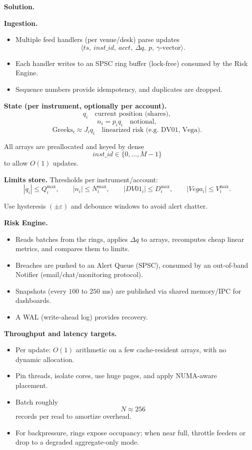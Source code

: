 \documentclass[11pt,letterpaper,openany]{book}
\begin{document}
\textbf{Solution.}


\textbf{Ingestion.}
\begin{itemize}
\item Multiple feed handlers (per venue/desk) parse updates
\[
\langle ts,\ inst\_id,\ acct,\ \Delta q,\ p,\ \gamma\text{-vector}\rangle.
\]
\item Each handler writes to an SPSC ring buffer (lock-free) consumed by the Risk Engine.
\item Sequence numbers provide idempotency, and duplicates are dropped.
\end{itemize}

\textbf{State (per instrument, optionally per account).}
\[
q_i \quad \text{current position (shares)},
\]
\[
n_i = p_i q_i \quad \text{notional},
\]
\[
\mathrm{Greeks}_i \approx J_i q_i \quad \text{linearized risk (e.g. DV01, Vega)}.
\]

All arrays are preallocated and keyed by dense
\[
inst\_id \in \{0,\dots,M-1\}
\]
to allow \(O(1)\) updates.

\textbf{Limits store.} Thresholds per instrument/account:
\[
|q_i| \le Q_i^{\max},
\qquad
|n_i| \le N_i^{\max},
\qquad
|DV01_i| \le D_i^{\max},
\qquad
|Vega_i| \le V_i^{\max}.
\]

Use hysteresis \((\pm \varepsilon)\) and debounce windows to avoid alert chatter.

\textbf{Risk Engine.}
\begin{itemize}
\item Reads batches from the rings, applies \(\Delta q\) to arrays, recomputes cheap linear metrics, and compares them to limits.
\item Breaches are pushed to an Alert Queue (SPSC), consumed by an out-of-band Notifier (email/chat/monitoring protocol).
\item Snapshots (every \(100\) to \(250\) ms) are published via shared memory/IPC for dashboards.
\item A WAL (write-ahead log) provides recovery.
\end{itemize}

\textbf{Throughput and latency targets.}
\begin{itemize}
\item Per update: \(O(1)\) arithmetic on a few cache-resident arrays, with no dynamic allocation.
\item Pin threads, isolate cores, use huge pages, and apply NUMA-aware placement.
\item Batch roughly
\[
N \approx 256
\]
records per read to amortize overhead.
\item For backpressure, rings expose occupancy; when near full, throttle feeders or drop to a degraded aggregate-only mode.
\end{itemize}
\end{document}
